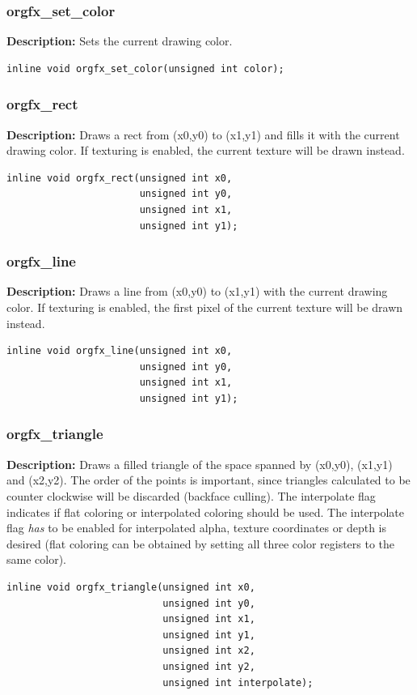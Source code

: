 \documentclass[10pt,a4paper]{article}
\begin{document}
\subsubsection{orgfx\_set\_color}
\textbf{Description:} Sets the current drawing color.
\begin{lstlisting}
inline void orgfx_set_color(unsigned int color);
\end{lstlisting}

\subsubsection{orgfx\_rect}
\textbf{Description:} Draws a rect from (x0,y0) to (x1,y1) and fills it with the current drawing color. If texturing is enabled, the current texture will be drawn instead.
\begin{lstlisting}
inline void orgfx_rect(unsigned int x0, 
                       unsigned int y0, 
                       unsigned int x1, 
                       unsigned int y1);
\end{lstlisting}

\subsubsection{orgfx\_line}
\textbf{Description:} Draws a line from (x0,y0) to (x1,y1) with the current drawing color. If texturing is enabled, the first pixel of the current texture will be drawn instead.
\begin{lstlisting}
inline void orgfx_line(unsigned int x0, 
                       unsigned int y0, 
                       unsigned int x1, 
                       unsigned int y1);
\end{lstlisting}

\subsubsection{orgfx\_triangle}
\textbf{Description:} Draws a filled triangle of the space spanned by (x0,y0), (x1,y1) and (x2,y2). The order of the points is important, since triangles calculated to be counter clockwise will be discarded (backface culling). The interpolate flag indicates if flat coloring or interpolated coloring should be used. The interpolate flag \textit{has} to be enabled for interpolated alpha, texture coordinates or depth is desired (flat coloring can be obtained by setting all three color registers to the same color).
\begin{lstlisting}
inline void orgfx_triangle(unsigned int x0, 
                           unsigned int y0, 
                           unsigned int x1, 
                           unsigned int y1, 
                           unsigned int x2, 
                           unsigned int y2,
                           unsigned int interpolate);
\end{lstlisting}
\end{document}
